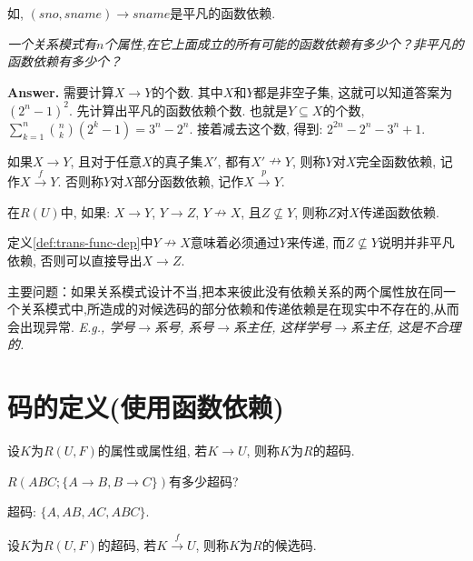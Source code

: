 如, $(sno,sname)\to sname$是平凡的函数依赖.

\textit{一个关系模式有$n$个属性,在它上面成立的所有可能的函数依赖有多少个？非平凡的函数依赖有多少个？}

\textbf{Answer.} 需要计算$X\to Y$的个数. 其中$X$和$Y$都是非空子集, 这就可以知道答案为$(2^n-1)^2$.  先计算出平凡的函数依赖个数. 也就是$Y\subseteq X$的个数, $\sum_{k=1}^{n} \binom{n}{k} (2^k-1)=3^n-2^n$. 接着减去这个数, 得到: $2^{2n}-2^n-3^n+1$.


\begin{definition}[完全函数依赖] \label{def:tot-func-dep}
  如果$X\to Y$, 且对于任意$X$的真子集$X'$, 都有$X' \nrightarrow Y$, 则称$Y$对$X$完全函数依赖, 记作$X\overset{f}{\rightarrow} Y$. 否则称$Y$对$X$部分函数依赖, 记作$X\overset{p}{\rightarrow}Y$.
\end{definition}

\begin{definition}[传递函数依赖] \label{def:trans-func-dep}
  在$R(U)$中, 如果: $X\to Y$, $Y\to Z$, $Y\nrightarrow X$, 且$Z\nsubseteq Y$, 则称$Z$对$X$传递函数依赖.
\end{definition}

\begin{remark}
  定义\ref{def:trans-func-dep}中$Y\nrightarrow X$意味着必须通过$Y$来传递, 而$Z\nsubseteq Y$说明并非平凡依赖, 否则可以直接导出$X\to Z$.
\end{remark}

主要问题：如果关系模式设计不当,把本来彼此没有依赖关系的两个属性放在同一个关系模式中,所造成的对候选码的部分依赖和传递依赖是在现实中不存在的,从而会出现异常.
\textit{E.g., 学号$\to$系号, 系号$\to$系主任, 这样学号$\to$系主任, 这是不合理的.}

\section{码的定义(使用函数依赖)}

\begin{definition}[超码]
  设$K$为$R(U,F)$的属性或属性组, 若$K\to U$, 则称$K$为$R$的超码.
\end{definition}

\begin{example}
  $R(ABC;\{A\to B,B\to C\})$有多少超码?

  超码: $\{A,AB,AC,ABC\}$.
\end{example}

\begin{definition}[候选码]
  设$K$为$R(U,F)$的超码, 若$K\overset{f}{\rightarrow} U$, 则称$K$为$R$的候选码.
\end{definition}

